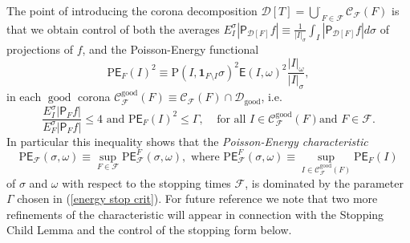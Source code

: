 \documentclass{amsart}%
\theoremstyle{plain}
\numberwithin{equation}{section}
\begin{document}
The point of introducing the corona decomposition $\mathcal{D}\left[
T\right]  =\overset{\cdot}{\bigcup}_{F\in\mathcal{F}}\mathcal{C}_{\mathcal{F}%
}\left(  F\right)  $ is that we obtain control of both the averages
$E_{I}^{\sigma}\left\vert \mathsf{P}_{\mathcal{D}\left[  F\right]
}f\right\vert \equiv\frac{1}{\left\vert I\right\vert _{\sigma}}\int
_{I}\left\vert \mathsf{P}_{\mathcal{D}\left[  F\right]  }f\right\vert d\sigma$
of projections of $f$, and the Poisson-Energy functional%
\[
\mathrm{P}\mathsf{E}_{F}\left(  I\right)  ^{2}\equiv\mathrm{P}\left(
I,\mathbf{1}_{F\setminus I}\sigma\right)  ^{2}\mathsf{E}\left(  I,\omega
\right)  ^{2}\frac{\left\vert I\right\vert _{\omega}}{\left\vert I\right\vert
_{\sigma}},
\]
in each $\operatorname{good}$ corona $\mathcal{C}_{\mathcal{F}}%
^{\operatorname{good}}\left(  F\right)  \equiv\mathcal{C}_{\mathcal{F}}\left(
F\right)  \cap\mathcal{D}_{\operatorname{good}}$, i.e.%
\[
\frac{E_{I}^{\sigma}\left\vert \mathsf{P}_{F}f\right\vert }{E_{F}^{\sigma
}\left\vert \mathsf{P}_{F}f\right\vert }\leq4\text{ and }\mathrm{P}%
\mathsf{E}_{F}\left(  I\right)  ^{2}\leq\Gamma,\ \ \ \ \ \text{for all }%
I\in\mathcal{C}_{\mathcal{F}}^{\operatorname{good}}\left(  F\right)  \text{
and }F\in\mathcal{F}.
\]
In particular this inequality shows that the \emph{Poisson-Energy
characteristic}%
\begin{equation}
\mathrm{P}\mathsf{E}_{\mathcal{F}}\left(  \sigma,\omega\right)  \equiv
\sup_{F\in\mathcal{F}}\mathrm{P}\mathsf{E}_{\mathcal{F}}^{F}\left(
\sigma,\omega\right)  ,\text{ where }\mathrm{P}\mathsf{E}_{\mathcal{F}}%
^{F}\left(  \sigma,\omega\right)  \equiv\sup_{I\in\mathcal{C}_{\mathcal{F}%
}^{\operatorname{good}}\left(  F\right)  }\mathrm{P}\mathsf{E}_{F}\left(
I\right) \label{PE char}%
\end{equation}
of $\sigma$ and $\omega$ with respect to the stopping times $\mathcal{F}$, is
dominated by the parameter $\Gamma$ chosen in (\ref{energy stop crit}). For
future reference we note that two more refinements of the characteristic will
appear in connection with the Stopping Child Lemma and the control of the
stopping form below.
\end{document}
